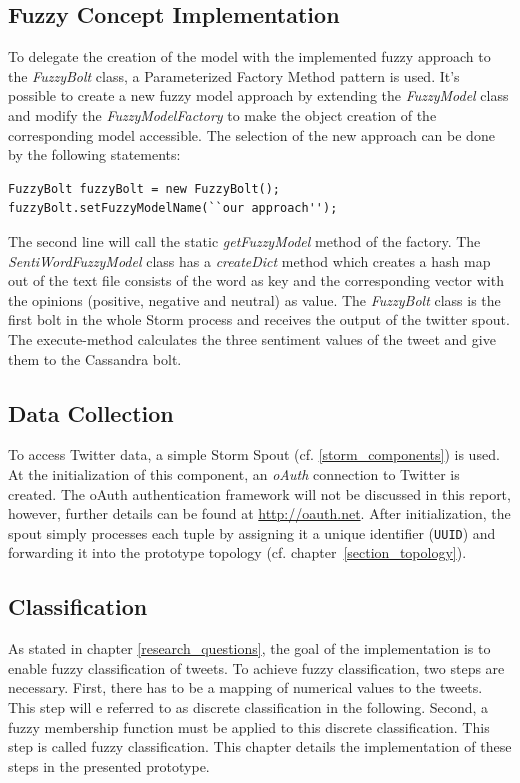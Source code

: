 \documentclass[a4paper]{article}
\begin{document}
\subsection{Fuzzy Concept Implementation}
To delegate the creation of the model with the implemented fuzzy approach to the \textit{FuzzyBolt} class, a Parameterized Factory Method pattern is used. It's possible to create a new fuzzy model approach by extending the \textit{FuzzyModel} class and modify the \textit{FuzzyModelFactory} to make the object creation of the corresponding model accessible. The selection of the new approach can be done by the following statements:
\lstset{language=Java}
\begin{lstlisting}
FuzzyBolt fuzzyBolt = new FuzzyBolt();
fuzzyBolt.setFuzzyModelName(``our approach'');
\end{lstlisting}
The second line will call the static \textit{getFuzzyModel} method of the factory.
The \textit{SentiWordFuzzyModel} class has a \textit{createDict} method which creates a hash map out of the text file consists of the word as key and the corresponding vector with the opinions (positive, negative and neutral) as value.
The \textit{FuzzyBolt} class is the first bolt in the whole Storm process and receives the output of the twitter spout. The execute-method calculates the three sentiment values of the tweet and give them to the Cassandra bolt.

\subsection{Data Collection}
To access Twitter data, a simple Storm Spout (cf. \ref{storm_components}) is used. At the initialization of this component, an \textit{oAuth} connection to Twitter is created. The oAuth authentication framework will not be discussed in this report, however, further details can be found at \url{http://oauth.net}. After initialization, the spout simply processes each tuple by assigning it a unique identifier (\texttt{UUID}) and forwarding it into the prototype topology (cf. chapter~\ref{section_topology}).

\subsection{Classification}
As stated in chapter \ref{research_questions}, the goal of the implementation is to enable fuzzy classification of tweets. To achieve fuzzy classification, two steps are necessary. First, there has to be a mapping of numerical values to the tweets. This step will e referred to as discrete classification in the following. Second, a fuzzy membership function must be applied to this discrete classification. This step is called fuzzy classification. This chapter details the implementation of these steps in the presented prototype.\\
\end{document}
